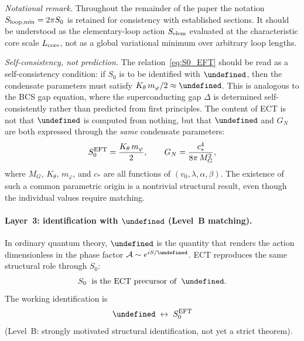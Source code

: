 \documentclass[11pt,a4paper]{article}
\let\hbar\undefined
\numberwithin{equation}{section}
\begin{document}
\emph{Notational remark.}
Throughout the remainder of the paper the notation
$S_{\rm loop,min}=2\pi S_0$ is retained for consistency with
established sections.
It should be understood as the elementary-loop action
$S_{\rm elem}$ evaluated at the characteristic core scale
$L_{\rm core}$, not as a global variational minimum over
arbitrary loop lengths.

\emph{Self-consistency, not prediction.}
The relation~\eqref{eq:S0_EFT} should be read as a
self-consistency condition: if $S_0$ is to be identified with
$\hbar$, then the condensate parameters must satisfy
$K_\theta\,m_\varphi/2\approx\hbar$.
This is analogous to the BCS gap equation, where the
superconducting gap $\Delta$ is determined self-consistently
rather than predicted from first principles.
The content of ECT is not that $\hbar$ is computed from nothing,
but that $\hbar$ and $G_N$ are both expressed through the
\emph{same} condensate parameters:
\begin{equation}
  S_0^{\rm EFT} = \frac{K_\theta\,m_\varphi}{2},
  \qquad
  G_N = \frac{c_*^4}{8\pi\,M_G^2},
  \label{eq:hbar_GN_same_condensate}
\end{equation}
where $M_G$, $K_\theta$, $m_\varphi$, and $c_*$ are all functions
of $(v_0,\lambda,\alpha,\beta)$.
The existence of such a common parametric origin is a nontrivial
structural result, even though the individual values require matching.


\paragraph{Layer~3: identification with $\hbar$ (Level~B matching).}

In ordinary quantum theory, $\hbar$ is the quantity that renders the
action dimensionless in the phase factor
$\mathcal{A}\sim e^{iS/\hbar}$.
ECT reproduces the same structural role through $S_0$:
\begin{equation}
  S_0 \;\text{ is the ECT precursor of }\; \hbar.
  \label{eq:S0_precursor_hbar}
\end{equation}
The working identification is
\begin{equation}
  \hbar \;\leftrightarrow\; S_0^{\rm EFT}
  \label{eq:hbar_S0_identification}
\end{equation}
(Level~B: strongly motivated structural identification, not yet a
strict theorem).
\end{document}
